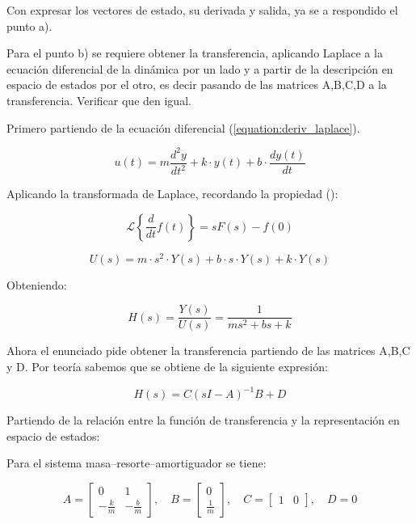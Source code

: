 \documentclass[a4paper]{article}
\begin{document}
Con expresar los vectores de estado, su derivada y salida, ya se a respondido el punto a).

Para el punto b) se requiere obtener la transferencia, aplicando Laplace a la ecuación diferencial de la dinámica por un lado y a partir de la descripción en espacio de estados por el otro, es decir pasando de las matrices A,B,C,D a la transferencia. Verificar que den igual.

Primero partiendo de la ecuación diferencial (\ref{equation:deriv_laplace}).

\begin{equation}\label{equation:ecDif_hallar_H}
	u(t) = m \frac{d^2 y}{dt^2 } + k \cdot y(t) + b \cdot \frac{dy(t)}{dt}
\end{equation}


Aplicando la transformada de Laplace, recordando la propiedad ():

\begin{equation}\label{equation:deriv_laplace}
	\mathcal{L}\left\{\frac{d}{dt}f(t)\right\} = sF(s) - f(0)
\end{equation}


\begin{equation}\label{equation:ecDif_hallar_H_2}
	U(s) = m \cdot s^2 \cdot Y(s) + b \cdot s \cdot Y(s) + k \cdot Y(s)
\end{equation}

Obteniendo:


\begin{equation}\label{equation:ecDif_hallar_H_3}
	H(s) = \frac{Y(s)}{U(s)} = \frac{1}{m s^2 + b s + k}
\end{equation}


Ahora el enunciado pide obtener la transferencia partiendo de las matrices A,B,C y D.
Por teoría sabemos que se obtiene de la siguiente expresión: 

\begin{equation}
	H(s) = C(sI - A)^{-1}B + D
\end{equation}


Partiendo de la relación entre la función de transferencia y la
representación en espacio de estados:


Para el sistema masa–resorte–amortiguador se tiene:

\begin{equation}
	A=
	\begin{bmatrix}
		0 & 1\\
		-\frac{k}{m} & -\frac{b}{m}
	\end{bmatrix},
	\quad
	B=
	\begin{bmatrix}
		0\\
		\frac{1}{m}
	\end{bmatrix},
	\quad
	C=
	\begin{bmatrix}
		1 & 0
	\end{bmatrix},
	\quad
	D=0
\end{equation}
\end{document}
